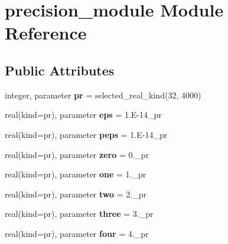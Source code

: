 \hypertarget{classprecision__module}{\section{precision\+\_\+module Module Reference}
\label{classprecision__module}
}
\subsection*{Public Attributes}
\begin{DoxyCompactItemize}
\item 
\hypertarget{classprecision__module_a666769eb09991cb5f073620c9042674e}{integer, parameter {\bfseries pr} = selected\+\_\+real\+\_\+kind(32, 4000)}\label{classprecision__module_a666769eb09991cb5f073620c9042674e}

\item 
\hypertarget{classprecision__module_af1c73fb151b9820e507052293ef6e4bf}{real(kind=pr), parameter {\bfseries eps} = 1.\+E-\/14\+\_\+pr}\label{classprecision__module_af1c73fb151b9820e507052293ef6e4bf}

\item 
\hypertarget{classprecision__module_a0e5314b479911716c1a708ef3ffe4aa9}{real(kind=pr), parameter {\bfseries peps} = 1.\+E-\/14\+\_\+pr}\label{classprecision__module_a0e5314b479911716c1a708ef3ffe4aa9}

\item 
\hypertarget{classprecision__module_a5c4729f5ae76a54c36ac15655ce815ef}{real(kind=pr), parameter {\bfseries zero} = 0.\+\_\+pr}\label{classprecision__module_a5c4729f5ae76a54c36ac15655ce815ef}

\item 
\hypertarget{classprecision__module_a9985a1c3ada8b0f360aecd58a7da0209}{real(kind=pr), parameter {\bfseries one} = 1.\+\_\+pr}\label{classprecision__module_a9985a1c3ada8b0f360aecd58a7da0209}

\item 
\hypertarget{classprecision__module_a97a3cf9023f43607709fcf9f79f4cf2d}{real(kind=pr), parameter {\bfseries two} = 2.\+\_\+pr}\label{classprecision__module_a97a3cf9023f43607709fcf9f79f4cf2d}

\item 
\hypertarget{classprecision__module_a974fae5c7034e0f3942510dd7f07c50c}{real(kind=pr), parameter {\bfseries three} = 3.\+\_\+pr}\label{classprecision__module_a974fae5c7034e0f3942510dd7f07c50c}

\item 
\hypertarget{classprecision__module_af213aa02e1e91ee1be1e7f9d6ebf1ffc}{real(kind=pr), parameter {\bfseries four} = 4.\+\_\+pr}\label{classprecision__module_af213aa02e1e91ee1be1e7f9d6ebf1ffc}


\end{DoxyCompactItemize}
